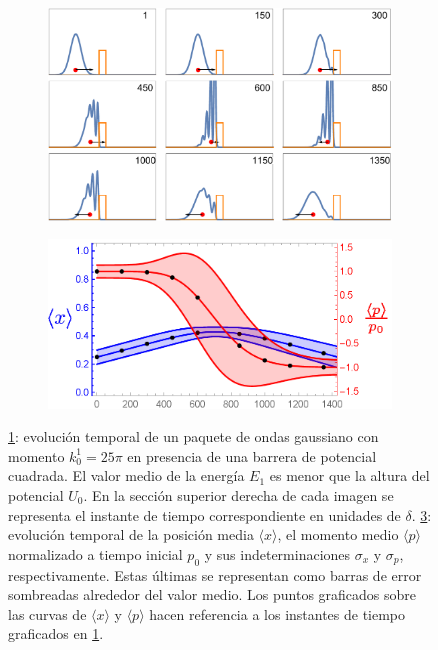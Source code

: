\documentclass[aps,prb,twocolumn,superscriptaddress,floatfix,longbibliography]{revtex4-2}
\begin{document}
\begin{figure}
     \centering
     \begin{subfigure}[b]{0.45\textwidth}
         \centering
         \includegraphics[width=\textwidth]{evolution_2i.pdf}
         \caption{\label{fig:evolution_2i}}
     \end{subfigure}
     \hfill
     \begin{subfigure}[b]{0.45\textwidth}
         \centering
         \includegraphics[width=\textwidth]{valores_medios_2i.png}
         \caption{\label{fig:valores_medios_2i}}
     \end{subfigure}
     \caption{\ref{fig:evolution_2i}: evolución temporal de un paquete de ondas gaussiano con momento $k_0^1 = 25 \pi$ en presencia de una barrera de potencial cuadrada. El valor medio de la energía $E_1$ es menor que la altura del potencial $U_0$. En la sección superior derecha de cada imagen se representa el instante de tiempo correspondiente en unidades de $\delta$. \ref{fig:valores_medios_2i}: evolución temporal de la posición media $\langle x \rangle$, el momento medio $\langle p \rangle$ normalizado a tiempo inicial $p_0$ y sus indeterminaciones $\sigma_x$ y $\sigma_p$, respectivamente. Estas últimas se representan como barras de error sombreadas alrededor del valor medio. Los puntos graficados sobre las curvas de $\langle x \rangle$ y $\langle p \rangle$ hacen referencia a los instantes de tiempo graficados en \ref{fig:evolution_2i}.}
\end{figure}
\end{document}
